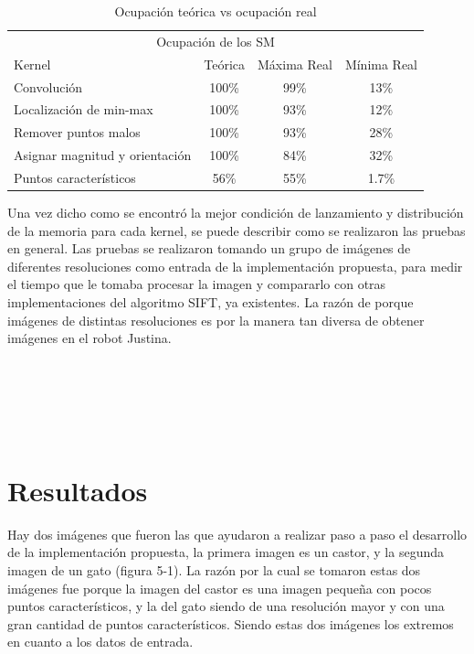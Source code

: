 \begin{table}[H]
\centering
\begin{tabular}{|l|c|c|c|}
\hline
\multicolumn{4}{|c|}{Ocupación de los SM} \\
\cline{1-4}
Kernel & Teórica &  Máxima Real &  Mínima Real\\
\hline \hline
 Convolución      				& 100\%   &  99\%   &   13\%                     \\ \cline{1-4}
 Localización de min-max    	& 100\%   &  93\%   &   12\% \\ \cline{1-4}
 Remover puntos malos 			& 100\%   &  93\%   &   28\%                \\ \cline{1-4}
 Asignar magnitud y orientación & 100\%   &  84\%   &   32\%            \\ \cline{1-4}
 Puntos característicos 		& 56\%    &  55\%   &   1.7\%           \\ \cline{1-4}
\end{tabular}
\caption{Ocupación teórica vs ocupación real}
\label{tabla:final}
\end{table}
Una vez dicho como se encontró la mejor condición de lanzamiento y distribución de la memoria para cada kernel, se puede describir como se realizaron las pruebas en general. Las pruebas se realizaron tomando un grupo de imágenes de diferentes resoluciones como entrada de la implementación propuesta, para medir el tiempo que le tomaba procesar la imagen y compararlo con otras implementaciones del algoritmo SIFT, ya existentes. La razón de porque imágenes de distintas resoluciones es por la manera tan diversa de obtener imágenes en el robot Justina.\\\\\\\\\\\\
\section{Resultados}
Hay dos imágenes que fueron las que ayudaron a realizar paso a paso el desarrollo de la implementación propuesta, la primera imagen es un castor, y la segunda imagen de un gato (figura 5-1). La razón por la cual se tomaron estas dos imágenes fue porque la imagen del castor es una imagen pequeña con pocos puntos característicos, y la del gato siendo de una resolución mayor y con una gran cantidad de puntos característicos. Siendo estas dos imágenes los extremos en cuanto a los datos de entrada.\\

